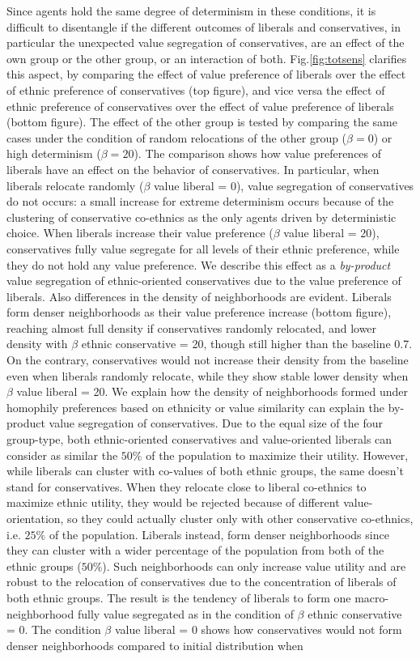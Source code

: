 \documentclass[
]{article}
\begin{document}
 Since agents hold the same degree of determinism in these conditions, it is difficult to disentangle if the different outcomes of liberals and conservatives, in particular the unexpected value segregation of conservatives, are an effect of the own group or the other group, or an interaction of both. Fig.\ref{fig:totsens} clarifies this aspect, by comparing the effect of value preference of liberals over the effect of ethnic preference of conservatives (top figure), and vice versa the effect of ethnic preference of conservatives over the effect of value preference of liberals (bottom figure). The effect of the other group is tested by comparing the same cases under the condition of random relocations of the other group ($\beta = 0$) or high determinism ($\beta = 20$). The comparison shows how value preferences of liberals have an effect on the behavior of conservatives. In particular, when liberals relocate randomly ($\beta$ value liberal = 0), value segregation of conservatives do not occurs: a small increase for extreme determinism occurs because of the clustering of conservative co-ethnics as the only agents driven by deterministic choice. When liberals increase their value preference ($\beta$ value liberal = 20), conservatives fully value segregate for all levels of their ethnic preference, while they do not hold any value preference. We describe this effect as a \textit{by-product} value segregation of ethnic-oriented conservatives due to the value preference of liberals. Also differences in the density of neighborhoods are evident. Liberals form denser neighborhoods as their value preference increase (bottom figure), reaching almost full density if conservatives randomly relocated, and lower density with $\beta$ ethnic conservative = 20, though still higher than the baseline 0.7. On the contrary, conservatives would not increase their density from the baseline even when liberals randomly relocate, while they show stable lower density when $\beta$ value liberal = 20. We explain how the density of neighborhoods formed under homophily preferences based on ethnicity or value similarity can explain the by-product value segregation of conservatives. Due to the equal size of the four group-type, both ethnic-oriented conservatives and value-oriented liberals can consider as similar the $50\%$ of the population to maximize their utility. However, while liberals can cluster with co-values of both ethnic groups, the same doesn't stand for conservatives. When they relocate close to liberal co-ethnics to maximize ethnic utility, they would be rejected because of different value-orientation, so they could actually cluster only with other conservative co-ethnics, i.e. $25\%$ of the population. Liberals instead, form denser neighborhoods since they can cluster with a wider percentage of the population from both of the ethnic groups ($50\%$). Such neighborhoods can only increase value utility and are robust to the relocation of conservatives due to the concentration of liberals of both ethnic groups. The result is the tendency of liberals to form one macro-neighborhood fully value segregated as in the condition of $\beta$ ethnic conservative = 0. The condition $\beta$ value liberal = 0 shows how conservatives would not form denser neighborhoods compared to initial distribution when 
\end{document}
